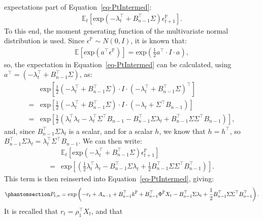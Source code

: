 \documentclass[
  letterpaper,
  DIV=11,
  numbers=noendperiod]{scrreprt}
\begin{document}
expectations part of Equation~\ref{eq-PtIntermed}:
\begin{align}
    \mathbb{E}_t \left[ \text{exp}\left( -\lambda^{\top}_t + B^{\top}_{n-1} \Sigma \right) \epsilon^\mathbb{P}_{t+1}  \right].
\end{align}
To this end, the moment generating function of the multivariate normal
distribution is used. Since \(\epsilon^\mathbb{P} \sim N(0,I)\), it is
known that:
\begin{align}
    \mathbb{E}[\text{exp}(a^{\top}\epsilon^\mathbb{P})] = \text{exp}\left( \frac{1}{2} a^{\top} \cdot I \cdot a  \right),
\end{align}
so, the expectation in Equation~\ref{eq-PtIntermed} can be calculated,
using \(a^{\top}=( -\lambda^{\top}_t + B^{\top}_{n-1} \Sigma )\), as:
\begin{align}
     &\text{exp} \left[ \frac{1}{2} ( -\lambda^{\top}_t + B^{\top}_{n-1} \Sigma ) \cdot I \cdot ( -\lambda^{\top}_t + B^{\top}_{n-1} \Sigma )^{\top}  \right] \nonumber \\
    = &\text{exp} \left[ \frac{1}{2} ( -\lambda^{\top}_t + B^{\top}_{n-1} \Sigma ) \cdot I \cdot ( -\lambda_t + \Sigma^{\top} B_{n-1} ) \right] \nonumber \\
    = &\text{exp} \left[ \frac{1}{2} \left( \lambda^{\top}_t \lambda_t - \lambda^{\top}_t\Sigma^{\top} B_{n-1} - B^{\top}_{n-1} \Sigma \lambda_t + B^{\top}_{n-1} \Sigma \Sigma^{\top} B_{n-1} \right) \right],
\end{align}
and, since \(B^{\top}_{n-1} \Sigma \lambda_t\) is a scalar, and for a
scalar \(h\), we know that \(h=h^{\top}\), so
\(B^{\top}_{n-1} \Sigma \lambda_t = \lambda^{\top}_t \Sigma^{\top} B_{n-1}\).
We can then write:
\begin{align}
    &\mathbb{E}_t \left[ \text{exp}\left( -\lambda^{\top}_t + B^{\top}_{n-1} \Sigma  \right)   \epsilon^\mathbb{P}_{t+1}  \right] \nonumber \\ 
    = &\text{exp}\left[  \left( \frac{1}{2} \lambda^{\top}_t \lambda_t - B^{\top}_{n-1} \Sigma \lambda_t + \frac{1}{2} B^{\top}_{n-1} \Sigma \Sigma^{\top} B^{\top}_{n-1} \right) \right].
\end{align}
This term is then reinserted into Equation~\ref{eq-PtIntermed}, giving:
\begin{equation}\protect\phantomsection\label{eq-Pt2}{
\begin{align}
    P_{t,n} = \text{exp}\left( -r_t + A_{n-1} + B^{\top}_{n-1} k^\mathbb{P} +B^{\top}_{n-1} \Phi^\mathbb{P} X_{t} - B^{\top}_{n-1} \Sigma \lambda_t + \frac{1}{2} B^{\top}_{n-1} \Sigma \Sigma^{\top} B^{\top}_{n-1} \right).
\end{align}
}\end{equation} It is recalled that \(r_t=\rho^{\top}_1 X_t\), and that
\end{document}
